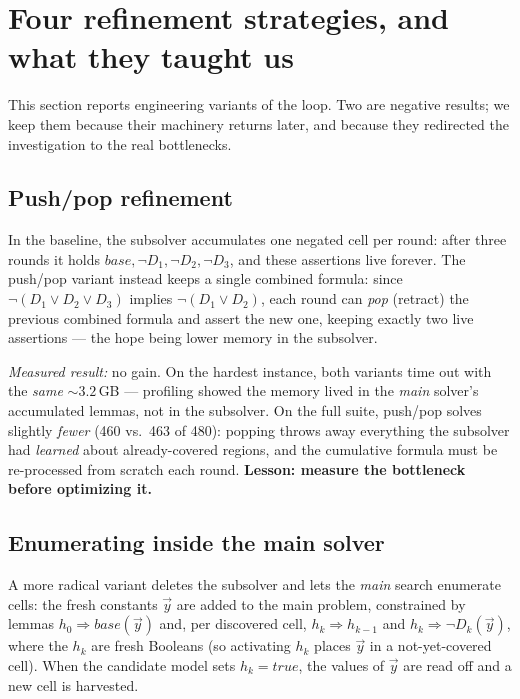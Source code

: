 \documentclass[11pt]{article}
\newcommand{\vy}{\ensuremath{\vec{y}}\xspace}
\newcommand{\true}{\ensuremath{\mathit{true}}\xspace}
\begin{document}
\section{Four refinement strategies, and what they taught us}

This section reports engineering variants of the loop. Two are negative
results; we keep them because their machinery returns later, and because
they redirected the investigation to the real bottlenecks.

\subsection{Push/pop refinement}

In the baseline, the subsolver accumulates one negated cell per round:
after three rounds it holds $\mathit{base}, \neg D_1, \neg D_2, \neg D_3$,
and these assertions live forever. The push/pop variant instead keeps a
single combined formula: since
$\neg(D_1 \vee D_2 \vee D_3)$ implies $\neg(D_1 \vee D_2)$, each round can
\emph{pop} (retract) the previous combined formula and assert the new one,
keeping exactly two live assertions --- the hope being lower memory in the
subsolver.

\emph{Measured result:} no gain. On the hardest instance, both variants
time out with the \emph{same} ${\sim}3.2$\,GB --- profiling showed the
memory lived in the \emph{main} solver's accumulated lemmas, not in the
subsolver. On the full suite, push/pop solves slightly \emph{fewer} (460
vs.\ 463 of 480): popping throws away everything the subsolver had
\emph{learned} about already-covered regions, and the cumulative formula
must be re-processed from scratch each round.
\textbf{Lesson: measure the bottleneck before optimizing it.}

\subsection{Enumerating inside the main solver}

A more radical variant deletes the subsolver and lets the \emph{main}
search enumerate cells: the fresh constants $\vy$ are added to the main
problem, constrained by lemmas
$h_0 \Rightarrow \mathit{base}(\vy)$ and, per discovered cell,
$h_k \Rightarrow h_{k-1}$ and $h_k \Rightarrow \neg D_k(\vy)$, where the
$h_k$ are fresh Booleans (so activating $h_k$ places $\vy$ in a
not-yet-covered cell). When the candidate model sets $h_k = \true$, the
values of $\vy$ are read off and a new cell is harvested.
\end{document}
